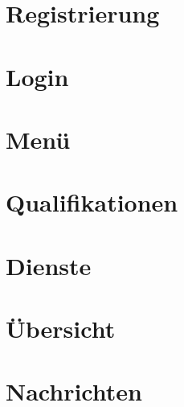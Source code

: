 \chapter{Registrierung}
\label{cha:register}

\chapter{Login}
\label{cha:login}

\chapter{Menü}
\label{cha:menu}

\chapter{Qualifikationen}
\label{cha:qualification}

\chapter{Dienste}
\label{cha:dienste}

\chapter{Übersicht}
\label{cha:uebersicht}

\chapter{Nachrichten}
\label{cha:nachrichten}